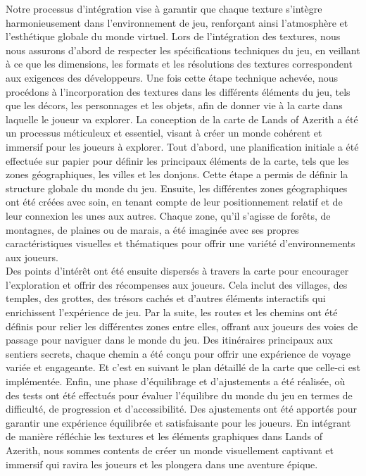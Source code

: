 Notre processus d'intégration vise à garantir que chaque texture s'intègre harmonieusement dans l'environnement de jeu, renforçant ainsi l'atmosphère et l'esthétique globale du monde virtuel.
Lors de l'intégration des textures, nous nous assurons d'abord de respecter les spécifications techniques du jeu, en veillant à ce que les dimensions, les formats et les résolutions des textures correspondent aux exigences des développeurs.
Une fois cette étape technique achevée, nous procédons à l'incorporation des textures dans les différents éléments du jeu, tels que les décors, les personnages et les objets, afin de donner vie à la carte dans laquelle le joueur va explorer.
La conception de la carte de Lands of Azerith a été un processus méticuleux et essentiel, visant à créer un monde cohérent et immersif pour les joueurs à explorer.
Tout d'abord, une planification initiale a été effectuée sur papier pour définir les principaux éléments de la carte, tels que les zones géographiques, les villes et les donjons.
Cette étape a permis de définir la structure globale du monde du jeu.
Ensuite, les différentes zones géographiques ont été créées avec soin, en tenant compte de leur positionnement relatif et de leur connexion les unes aux autres.
Chaque zone, qu'il s'agisse de forêts, de montagnes, de plaines ou de marais, a été imaginée avec ses propres caractéristiques visuelles et thématiques pour offrir une variété d'environnements aux joueurs.
\\

Des points d'intérêt ont été ensuite dispersés à travers la carte pour encourager l'exploration et offrir des récompenses aux joueurs.
Cela inclut des villages, des temples, des grottes, des trésors cachés et d'autres éléments interactifs qui enrichissent l'expérience de jeu.
Par la suite, les routes et les chemins ont été définis pour relier les différentes zones entre elles, offrant aux joueurs des voies de passage pour naviguer dans le monde du jeu.
Des itinéraires principaux aux sentiers secrets, chaque chemin a été conçu pour offrir une expérience de voyage variée et engageante.
Et c'est en suivant le plan détaillé de la carte que celle-ci est implémentée.
Enfin, une phase d'équilibrage et d'ajustements a été réalisée, où des tests ont été effectués pour évaluer l'équilibre du monde du jeu en termes de difficulté, de progression et d'accessibilité.
Des ajustements ont été apportés pour garantir une expérience équilibrée et satisfaisante pour les joueurs.
En intégrant de manière réfléchie les textures et les éléments graphiques dans Lands of Azerith, nous sommes contents de créer un monde visuellement captivant et immersif qui ravira les joueurs et les plongera dans une aventure épique.

